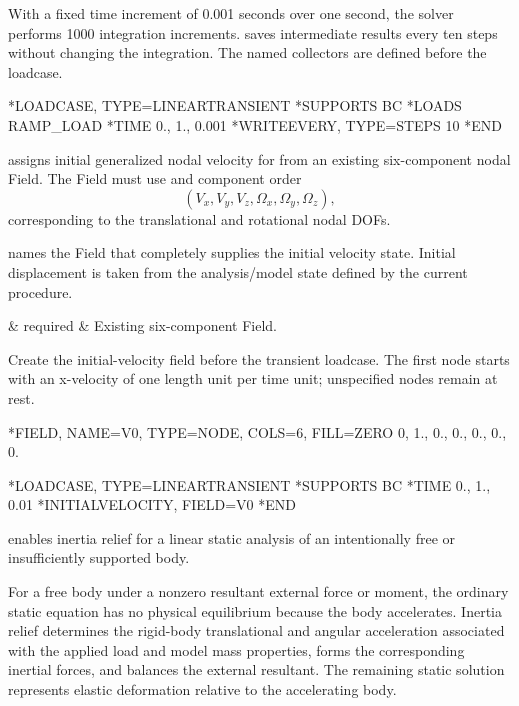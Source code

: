 With a fixed time increment of 0.001 seconds over one second,
the solver performs 1000 integration increments. 
saves intermediate results every ten steps without changing the
integration. The named collectors are defined before the loadcase.

\exampleheading
\begin{inputdeck}
*LOADCASE, TYPE=LINEARTRANSIENT
*SUPPORTS
BC
*LOADS
RAMP_LOAD
*TIME
0., 1., 0.001
*WRITEEVERY, TYPE=STEPS
10
*END
\end{inputdeck}


 assigns initial generalized nodal velocity for  from an existing six-component nodal Field. The Field must use  and component order
\[
(V_x,V_y,V_z,\Omega_x,\Omega_y,\Omega_z),
\]
corresponding to the translational and rotational nodal DOFs.

 names the Field that completely supplies the initial velocity state. Initial displacement is taken from the analysis/model state defined by the current procedure.

\begin{keywordparameters}
 & required & Existing six-component  Field. \\
\end{keywordparameters}

Create the initial-velocity field before the transient loadcase.
The first node starts with an x-velocity of one length unit per
time unit; unspecified nodes remain at rest.

\exampleheading
\begin{inputdeck}
*FIELD, NAME=V0, TYPE=NODE, COLS=6, FILL=ZERO
0, 1., 0., 0., 0., 0., 0.

*LOADCASE, TYPE=LINEARTRANSIENT
*SUPPORTS
BC
*TIME
0., 1., 0.01
*INITIALVELOCITY, FIELD=V0
*END
\end{inputdeck}


 enables inertia relief for a linear static analysis of an intentionally free or insufficiently supported body.

For a free body under a nonzero resultant external force or moment, the ordinary static equation has no physical equilibrium because the body accelerates. Inertia relief determines the rigid-body translational and angular acceleration associated with the applied load and model mass properties, forms the corresponding inertial forces, and balances the external resultant. The remaining static solution represents elastic deformation relative to the accelerating body.

